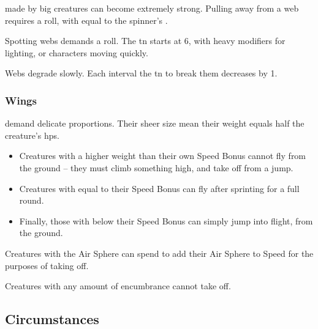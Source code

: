 \begin{multicols}{2}
made by big creatures can become extremely strong.
Pulling away from a web requires a  roll, with  equal to the spinner's .


Spotting webs demands a  roll.
The \gls{tn} starts at 6, with heavy modifiers for lighting, or characters moving quickly.

Webs degrade slowly.
Each \gls{interval} the \gls{tn} to break them decreases by 1.

\subsubsection{Wings}
demand delicate proportions.
Their sheer size mean their \gls{weight} equals half the creature's \glspl{hp}.

\begin{itemize}
  \item
  Creatures with a higher \gls{weight} than their own Speed Bonus cannot fly from the ground -- they must climb something high, and take off from a jump.
  \item
  Creatures with  equal to their Speed Bonus can fly after sprinting for a full round.
  \item
  Finally, those with  below their Speed Bonus can simply jump into flight, from the ground.
\end{itemize}

Creatures with the Air Sphere can spend  to add their Air Sphere to Speed for the purposes of taking off.

Creatures with any amount of encumbrance cannot take off.


\startcontents[Manoeuvres]

\subsection{Circumstances}


\end{multicols}
